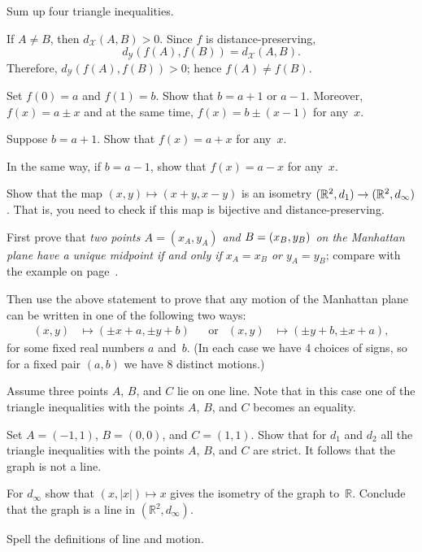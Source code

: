  Sum up four triangle inequalities.

If $A\ne B$, then $d_\mathcal{X}(A,B)>0$.
Since $f$ is distance-preserving,
$$d_\mathcal{Y}(f(A),f(B))=d_\mathcal{X}(A,B).$$
Therefore, $d_\mathcal{Y}(f(A),f(B))>0$; hence $f(A)\ne f(B)$.

Set $f(0)=a$ and $f(1)=b$.
Show that $b=a+1$ or $a-1$.
Moreover, $f(x)=a\pm x$ and at the same time, $f(x)=b\pm(x-1)$ for any~$x$.

Suppose $b=a+1$. 
Show that 
$f(x)=a+x$ for any~$x$.

In the same way, if $b=a-1$, 
show that 
$f(x)=a-x$ for any~$x$.

Show that the map $(x,y)\mapsto (x+y,x-y)$ is an isometry  $(\mathbb{R}^2,d_1)\z\to (\mathbb{R}^2,d_\infty)$.
That is, you need to check if this map is bijective and distance-preserving.

First prove that \textit{two points $A=(x_A,y_A)$ and $B\z=(x_B,y_B)$ on the Manhattan plane have a unique midpoint if and only if $x_A=x_B$ or $y_A=y_B$}; compare with the example on page~\pageref{example:isometric but not congruent}. 

Then use the above statement to prove that
any motion of the Manhattan plane 
can be written in one of the following two ways:
\begin{align*}
(x,y)&\mapsto (\pm x+a,\pm y+b)
&&\text{or} 
&(x,y)&\mapsto (\pm y+b,\pm x+a),
\end{align*}
for some fixed real numbers $a$ and~$b$.
(In each case we have 4 choices of signs, so for a fixed pair $(a,b)$ we have 8 distinct motions.)

Assume three points $A$, $B$, and $C$ lie on one line.
Note that in this case one of the triangle inequalities with the points $A$, $B$, and $C$ becomes an equality.

Set $A=(-1,1)$, $B=(0,0)$, and $C=(1,1)$.
Show that for $d_1$ and $d_2$
all the triangle inequalities with the points $A$, $B$, and $C$ are strict.
It follows that the graph is not a line.

For $d_\infty$ show that $(x,|x|)\mapsto x$ gives the isometry of the graph to~$\mathbb{R}$.
Conclude that the graph is a line in $(\mathbb{R}^2,d_\infty)$.

Spell the definitions of line and motion.

